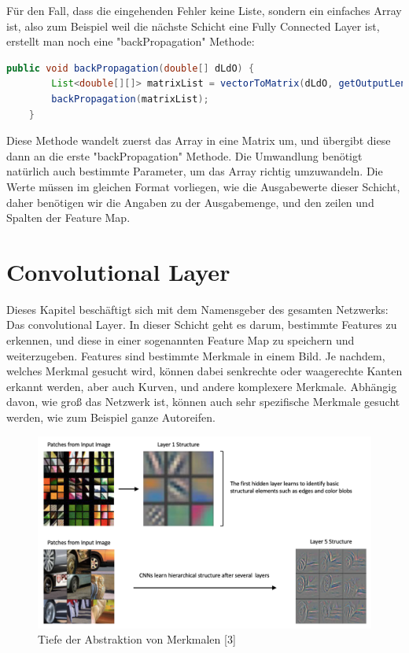 \documentclass[12pt]{article}
\begin{document}
Für den Fall, dass die eingehenden Fehler keine Liste, sondern ein einfaches Array ist, also zum Beispiel weil die nächste Schicht eine Fully Connected Layer ist, erstellt man noch eine "backPropagation" Methode:

\begin{lstlisting}[language=Java]
    public void backPropagation(double[] dLdO) {
        List<double[][]> matrixList = vectorToMatrix(dLdO, getOutputLength(), getOutputRows(), getOutputCols());
        backPropagation(matrixList);
    }
\end{lstlisting}
Diese Methode wandelt zuerst das Array in eine Matrix um, und übergibt diese dann an die erste "backPropagation" Methode. Die Umwandlung benötigt natürlich auch bestimmte Parameter, um das Array richtig umzuwandeln. Die Werte müssen im gleichen Format vorliegen, wie die Ausgabewerte dieser Schicht, daher benötigen wir die Angaben zu der Ausgabemenge, und den zeilen und Spalten der Feature Map.

\cleardoublepage
\section{Convolutional Layer}
Dieses Kapitel beschäftigt sich mit dem Namensgeber des gesamten Netzwerks: Das convolutional Layer. 
In dieser Schicht geht es darum, bestimmte Features zu erkennen, und diese in einer sogenannten Feature Map zu speichern und weiterzugeben. Features sind bestimmte Merkmale in einem Bild. Je nachdem, welches Merkmal gesucht wird, können dabei senkrechte oder waagerechte Kanten erkannt werden, aber auch Kurven, und andere komplexere Merkmale. Abhängig davon, wie groß das Netzwerk ist, können auch sehr spezifische Merkmale gesucht werden, wie zum Beispiel ganze Autoreifen. 

\begin{figure}[H]
\centering
\includegraphics[scale=0.27]{./Images/BA_003_tensorflow-keras-cnn-hierarchical-structure.png}
\caption{Tiefe der Abstraktion von Merkmalen [3]}
\label{Tiefe der Abstraktion von Merkmalen [3]}
\end{figure}
\end{document}

